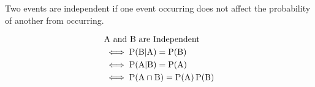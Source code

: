 \documentclass[../main]{subfiles}
\begin{document}
	Two events are independent if one event occurring does not affect the probability of another from occurring. 

	\begin{equation*} \begin{aligned}
		& \text{A and B are Independent} \\
		& \iff \operatorname{P}(\text{B} | \text{A}) = \operatorname{P}(\text{B}) \\
		& \iff \operatorname{P}(\text{A} | \text{B}) = \operatorname{P}(\text{A}) \\
		& \iff \operatorname{P}(\text{A} \cap \text{B}) = \operatorname{P}(\text{A}) \operatorname{P}(\text{B}) \\
	\end{aligned} \end{equation*}
\end{document}
